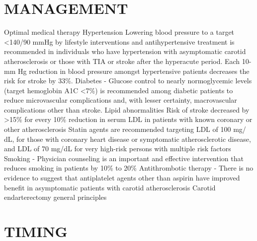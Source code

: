 \documentclass[
]{book}
\theoremstyle{definition}
\theoremstyle{definition}
\theoremstyle{definition}
\theoremstyle{definition}
\theoremstyle{remark}
\begin{document}
\hypertarget{management}{%
\section{MANAGEMENT}\label{management}}

Optimal medical therapy Hypertension Lowering blood pressure to a target
\textless140/90 mmHg by lifestyle interventions and antihypertensive treatment
is recommended in individuals who have hypertension with asymptomatic
carotid atherosclerosis or those with TIA or stroke after the hyperacute
period. Each 10-mm Hg reduction in blood pressure amongst hypertensive
patients decreases the risk for stroke by 33\%. Diabetes - Glucose
control to nearly normoglycemic levels (target hemoglobin A1C \textless7\%) is
recommended among diabetic patients to reduce microvascular
complications and, with lesser certainty, macrovascular complications
other than stroke. Lipid abnormalities Risk of stroke decreased by \textgreater15\%
for every 10\% reduction in serum LDL in patients with known coronary or
other atherosclerosis Statin agents are recommended targeting LDL of 100
mg/ dL, for those with coronary heart disease or symptomatic
atherosclerotic disease, and LDL of 70 mg/dL for very high-risk persons
with multiple risk factors Smoking - Physician counseling is an
important and effective intervention that reduces smoking in patients by
10\% to 20\% Antithrombotic therapy - There is no evidence to suggest that
antiplatelet agents other than aspirin have improved benefit in
asymptomatic patients with carotid atherosclerosis Carotid
endarterectomy general principles

\hypertarget{timing}{%
\section{TIMING}\label{timing}}
\end{document}

